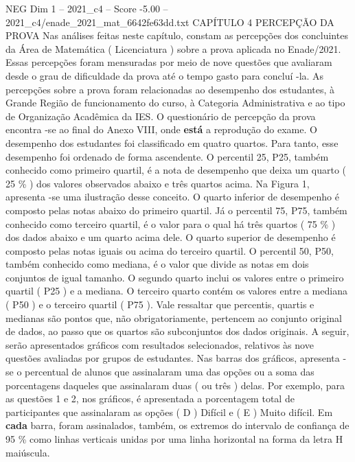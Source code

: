 \begin{textsample}{NEG Dim 1 – 2021\_c4 – Score -5.00 – 2021\_c4/enade\_2021\_mat\_6642fe63dd.txt}  \label{ex:f1_neg_066}
CAPÍTULO 4 PERCEPÇÃO DA PROVA Nas análises feitas neste capítulo, constam as percepções dos concluintes da Área de Matemática ( Licenciatura ) sobre a prova aplicada no Enade/2021.
Essas percepções foram mensuradas por meio de nove questões que avaliaram desde o grau de dificuldade da prova até o tempo gasto para concluí -la.
As percepções sobre a prova foram relacionadas ao desempenho dos estudantes, à Grande Região de funcionamento do curso, à Categoria Administrativa e ao tipo de Organização Acadêmica da IES.
O questionário de percepção da prova encontra -se ao final do Anexo VIII, onde \textbf{está} a reprodução do exame.
O desempenho dos estudantes foi classificado em quatro quartos.
Para tanto, esse desempenho foi ordenado de forma ascendente.
O percentil 25, P25, também conhecido como primeiro quartil, é a nota de desempenho que deixa um quarto ( 25 \% ) dos valores observados abaixo e três quartos acima.
Na Figura 1, apresenta -se uma ilustração desse conceito.
O quarto inferior de desempenho é composto pelas notas abaixo do primeiro quartil.
Já o percentil 75, P75, também conhecido como terceiro quartil, é o valor para o qual há três quartos ( 75 \% ) dos dados abaixo e um quarto acima dele.
O quarto superior de desempenho é composto pelas notas iguais ou acima do terceiro quartil.
O percentil 50, P50, também conhecido como mediana, é o valor que divide as notas em dois conjuntos de igual tamanho.
O segundo quarto inclui os valores entre o primeiro quartil ( P25 ) e a mediana.
O terceiro quarto contém os valores entre a mediana ( P50 ) e o terceiro quartil ( P75 ).
Vale ressaltar que percentis, quartis e medianas são pontos que, não obrigatoriamente, pertencem ao conjunto original de dados, ao passo que os quartos são subconjuntos dos dados originais.
A seguir, serão apresentados gráficos com resultados selecionados, relativos às nove questões avaliadas por grupos de estudantes.
Nas barras dos gráficos, apresenta -se o percentual de alunos que assinalaram uma das opções ou a soma das porcentagens daqueles que assinalaram duas ( ou três ) delas.
Por exemplo, para as questões 1 e 2, nos gráficos, é apresentada a porcentagem total de participantes que assinalaram as opções ( D ) Difícil e ( E ) Muito difícil.
Em \textbf{cada} barra, foram assinalados, também, os extremos do intervalo de confiança de 95 \% como linhas verticais unidas por uma linha horizontal na forma da letra H maiúscula.

\end{textsample}
